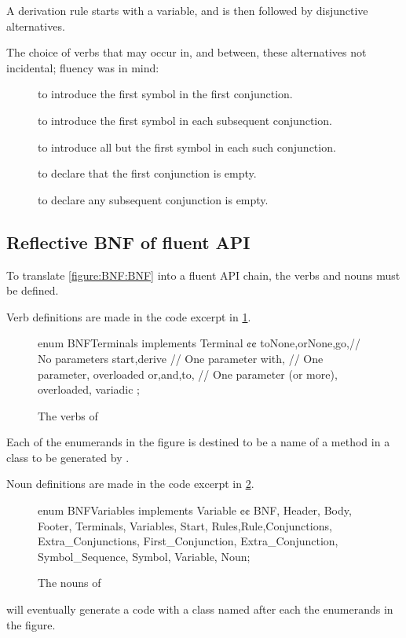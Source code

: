 A derivation rule starts with a variable, and is then followed by disjunctive alternatives.

The choice of verbs that may occur in, and between, these alternatives not incidental;
fluency was in mind:
\begin{description}
  \item[] to introduce the first symbol in the first conjunction.
  \item[] to introduce the first symbol in each subsequent conjunction.
  \item[] to introduce all but the first symbol in each such conjunction.
  \item[] to declare that the first conjunction is empty.
  \item[] to declare any subsequent conjunction is empty.
\end{description}

\subsection{Reflective BNF of fluent API}

To translate \cref{figure:BNF:BNF} into a fluent
API chain, the verbs and nouns must be defined.

Verb definitions are made in the code excerpt in
\cref{figure:Verbs}.

\begin{figure}[htb]
  \begin{JAVA}[style=code]
enum BNFTerminals implements Terminal {¢¢
  toNone,orNone,go,// No parameters
  start,derive // One parameter
  with, // One parameter, overloaded
  or,and,to, // One parameter (or more), overloaded, variadic
  ;
}\end{JAVA}
  \caption{The verbs of \Self}
  \label{figure:Verbs}
\end{figure}
Each of the enumerands in the figure is destined to be a
  name of a method in a class to be generated by \Self.

Noun definitions are made in the code excerpt in \cref{figure:Nouns}.

\begin{figure}[htb]
  \begin{JAVA}[style=code]
enum BNFVariables implements Variable {¢¢
  BNF, Header, Body, Footer,
  Terminals, Variables, Start,
  Rules,Rule,Conjunctions, Extra_Conjunctions,
  First_Conjunction, Extra_Conjunction, Symbol_Sequence,
  Symbol, Variable, Noun;
}\end{JAVA}
  \caption{The nouns of \Self}
  \label{figure:Nouns}
\end{figure}
  \Self will eventually generate a code with
  a class named after each the enumerands in the figure.

